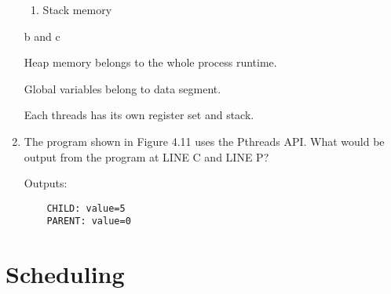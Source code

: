 \begin{enumerate}
\begin{enumerate}
        \item Stack memory
    \end{enumerate}

    b and c

    Heap memory belongs to the whole process runtime.
    
    Global variables belong to data segment.
    
    Each threads has its own register set and stack.
    
    \item The program shown in Figure 4.11 uses the Pthreads API. What would be output from the program at LINE C and LINE P?
    
    
    
    Outputs:

    \begin{lstlisting}
    CHILD: value=5
    PARENT: value=0
    \end{lstlisting}
    
\end{enumerate}


\chapter{Scheduling}

